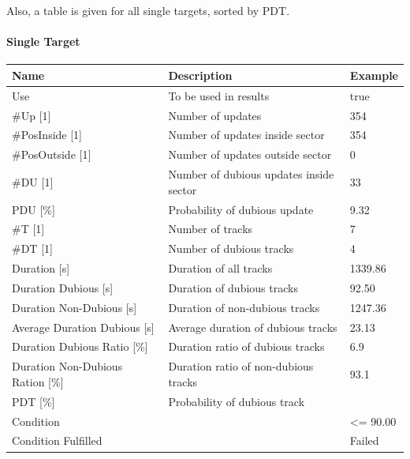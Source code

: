 Also, a table is given for all single targets, sorted by PDT.

\paragraph{Single Target}

\begin{center}
 \begin{table}[H]
  \begin{tabularx}{\textwidth}{ | l | X |  l | }
    \hline
    \textbf{Name} & \textbf{Description} & \textbf{Example} \\ \hline
    Use & To be used in results & true \\ \hline
    \#Up [1] & Number of updates & 354 \\ \hline
    \#PosInside [1] & Number of updates inside sector & 354 \\ \hline
    \#PosOutside [1] & Number of updates outside sector & 0 \\ \hline
    \#DU [1] & Number of dubious updates inside sector & 33 \\ \hline
    PDU [\%] & Probability of dubious update & 9.32 \\ \hline
    \#T [1] & Number of tracks & 7 \\ \hline
    \#DT [1] & Number of dubious tracks & 4 \\ \hline
    Duration [s] & Duration of all tracks & 1339.86 \\ \hline
    Duration Dubious [s] & Duration of dubious tracks & 92.50 \\ \hline
    Duration Non-Dubious [s] & Duration of non-dubious tracks & 1247.36 \\ \hline
    Average Duration Dubious [s] & Average duration of dubious tracks & 23.13 \\ \hline
    Duration Dubious Ratio [\%] & Duration ratio of dubious tracks & 6.9 \\ \hline
    Duration Non-Dubious Ration [\%] & Duration ratio of non-dubious tracks & 93.1 \\ \hline
    PDT [\%] & Probability of dubious track &  \\ \hline
    Condition &  & <= 90.00 \\ \hline
    Condition Fulfilled &  & Failed \\ \hline
\end{tabularx}
\end{table}
\end{center}
